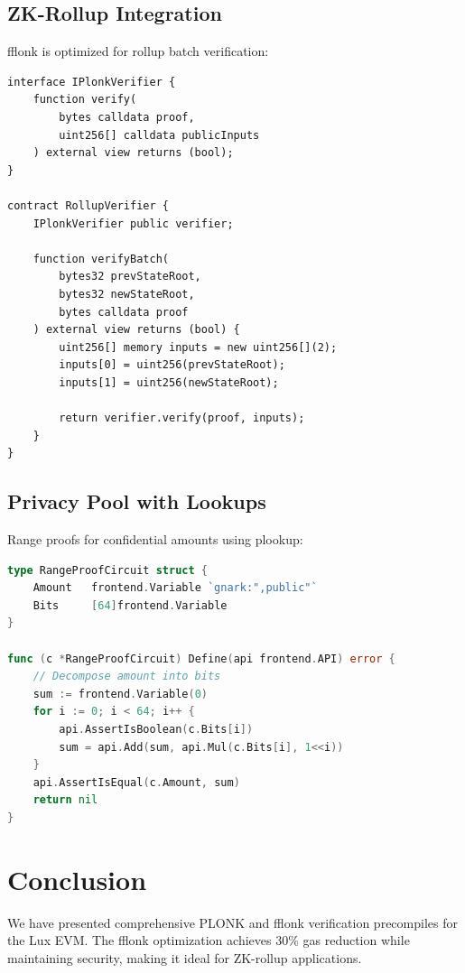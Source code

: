 \documentclass[11pt,a4paper]{article}
\theoremstyle{definition}
\begin{document}
\subsection{ZK-Rollup Integration}

fflonk is optimized for rollup batch verification:

\begin{lstlisting}[language=Solidity, caption={Rollup Verifier Contract}]
interface IPlonkVerifier {
    function verify(
        bytes calldata proof,
        uint256[] calldata publicInputs
    ) external view returns (bool);
}

contract RollupVerifier {
    IPlonkVerifier public verifier;

    function verifyBatch(
        bytes32 prevStateRoot,
        bytes32 newStateRoot,
        bytes calldata proof
    ) external view returns (bool) {
        uint256[] memory inputs = new uint256[](2);
        inputs[0] = uint256(prevStateRoot);
        inputs[1] = uint256(newStateRoot);

        return verifier.verify(proof, inputs);
    }
}
\end{lstlisting}

\subsection{Privacy Pool with Lookups}

Range proofs for confidential amounts using plookup:

\begin{lstlisting}[language=Go, caption={Range Proof Circuit}]
type RangeProofCircuit struct {
    Amount   frontend.Variable `gnark:",public"`
    Bits     [64]frontend.Variable
}

func (c *RangeProofCircuit) Define(api frontend.API) error {
    // Decompose amount into bits
    sum := frontend.Variable(0)
    for i := 0; i < 64; i++ {
        api.AssertIsBoolean(c.Bits[i])
        sum = api.Add(sum, api.Mul(c.Bits[i], 1<<i))
    }
    api.AssertIsEqual(c.Amount, sum)
    return nil
}
\end{lstlisting}

\section{Conclusion}

We have presented comprehensive PLONK and fflonk verification precompiles for the Lux EVM. The fflonk optimization achieves 30\% gas reduction while maintaining security, making it ideal for ZK-rollup applications.
\end{document}
